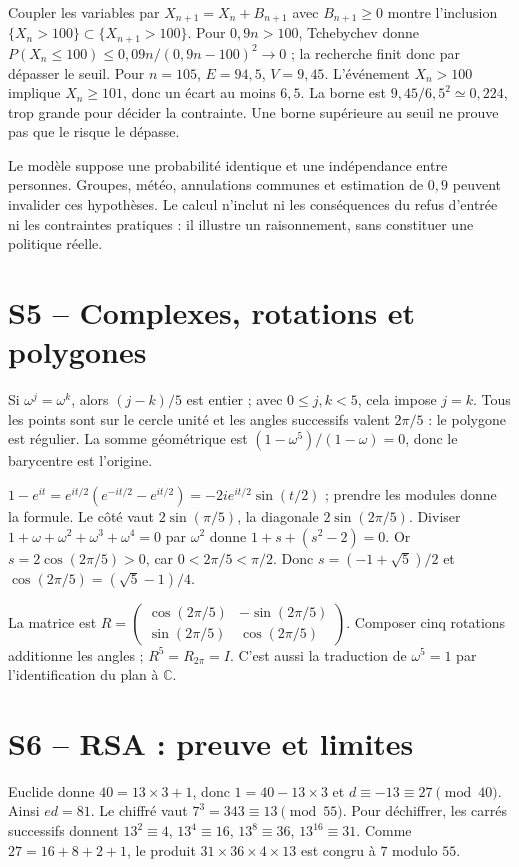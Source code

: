 Coupler les variables par $X_{n+1}=X_n+B_{n+1}$ avec $B_{n+1}\ge0$ montre l'inclusion $\{X_n>100\}\subset\{X_{n+1}>100\}$. Pour $0{,}9n>100$, Tchebychev donne $P(X_n\le100)\le0{,}09n/(0{,}9n-100)^2\to0$ ; la recherche finit donc par dépasser le seuil.
Pour $n=105$, $E=94{,}5$, $V=9{,}45$. L'événement $X_n>100$ implique $X_n\ge101$, donc un écart au moins $6{,}5$. La borne est $9{,}45/6{,}5^2\simeq0{,}224$, trop grande pour décider la contrainte. Une borne supérieure au seuil ne prouve pas que le risque le dépasse.

Le modèle suppose une probabilité identique et une indépendance entre personnes. Groupes, météo, annulations communes et estimation de $0{,}9$ peuvent invalider ces hypothèses. Le calcul n'inclut ni les conséquences du refus d'entrée ni les contraintes pratiques : il illustre un raisonnement, sans constituer une politique réelle.

\section{S5 -- Complexes, rotations et polygones}
Si $\omega^j=\omega^k$, alors $(j-k)/5$ est entier ; avec $0\le j,k<5$, cela impose $j=k$. Tous les points sont sur le cercle unité et les angles successifs valent $2\pi/5$ : le polygone est régulier. La somme géométrique est $(1-\omega^5)/(1-\omega)=0$, donc le barycentre est l'origine.

$1-e^{it}=e^{it/2}(e^{-it/2}-e^{it/2})=-2ie^{it/2}\sin(t/2)$ ; prendre les modules donne la formule. Le côté vaut $2\sin(\pi/5)$, la diagonale $2\sin(2\pi/5)$.
Diviser $1+\omega+\omega^2+\omega^3+\omega^4=0$ par $\omega^2$ donne $1+s+(s^2-2)=0$. Or $s=2\cos(2\pi/5)>0$, car $0<2\pi/5<\pi/2$. Donc $s=(-1+\sqrt5)/2$ et $\cos(2\pi/5)=(\sqrt5-1)/4$.

La matrice est $R=\begin{pmatrix}\cos(2\pi/5)&-\sin(2\pi/5)\\\sin(2\pi/5)&\cos(2\pi/5)\end{pmatrix}$. Composer cinq rotations additionne les angles ; $R^5=R_{2\pi}=I$. C'est aussi la traduction de $\omega^5=1$ par l'identification du plan à $\mathbb C$.

\section{S6 -- RSA : preuve et limites}
Euclide donne $40=13\times3+1$, donc $1=40-13\times3$ et $d\equiv-13\equiv27\pmod{40}$. Ainsi $ed=81$.
Le chiffré vaut $7^3=343\equiv13\pmod{55}$. Pour déchiffrer, les carrés successifs donnent $13^2\equiv4$, $13^4\equiv16$, $13^8\equiv36$, $13^{16}\equiv31$. Comme $27=16+8+2+1$, le produit $31\times36\times4\times13$ est congru à $7$ modulo $55$.

